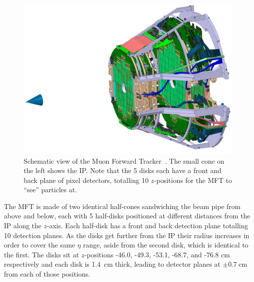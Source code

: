 \begin{figure}[ht]
    \begin{center}
        \includegraphics[width=.8\textwidth]{Figs/MFT_schematic.jpg}
        \caption{Schematic view of the Muon Forward Tracker~\cite{MFT_Schematic}. The small cone on the left shows the IP. Note that the 5 disks each have a front and back plane of pixel detectors, totalling 10 $z$-positions for the MFT to ``see'' particles at.}
        \label{fig:MFT Schematic}
    \end{center}
\end{figure}

The MFT is made of two identical half-cones sandwiching the beam pipe from above and below, each with 5 half-disks positioned at different distances from the IP along the $z$-axis. Each half-disk has a front and back detection plane totalling 10 detection planes. As the disks get further from the IP their radius increases in order to cover the same $\eta$ range, aside from the second disk, which is identical to the first. The disks sit at $z$-positions -46.0, -49.3, -53.1, -68.7, and -76.8 \si{\centi\metre} respectively and each disk is \SI{1.4}{\centi\metre} thick, leading to detector planes at $\pm \SI{0.7}{\centi\metre}$ from each of those positions.

